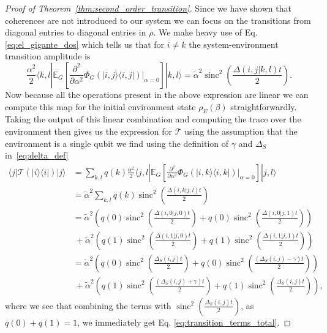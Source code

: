 \documentclass[
 amsmath,amssymb,
 aps,
onecolumn, 
nofootinbib]{revtex4-2}
\newcommand{\ket}[1]{|#1\rangle}
\newcommand{\bra}[1]{\langle #1|}
\newcommand{\ketbra}[2]{| #1\rangle\! \langle #2|}
\DeclareMathOperator{\sinc}{sinc}
\begin{document}
\begin{proof}[Proof of Theorem~\ref{thm:second_order_transition}]
    Since we have shown that coherences are not introduced to our system we can focus on the transitions from diagonal entries to diagonal entries in $\rho$. We make heavy use of Eq. \eqref{eq:el_gigante_dos} which tells us that for $i \neq k$ the system-environment transition amplitude is
    \begin{equation}
        \frac{\alpha^2}{2}\bra{k, l} \mathbb{E}_G \left[ \frac{\partial^2}{\partial \alpha^2} \Phi_G(\ketbra{i, j}{i,j}) \big|_{\alpha = 0} \right] \ket{k, l} = \widetilde{\alpha}^2 \sinc^2 \left( \frac{\Delta(i,j | k, l) t}{2} \right). 
    \end{equation}
    Now because all the operations present in the above expression are linear we can compute this map for the initial environment state $\rho_E(\beta)$ straightforwardly. Taking the output of this linear combination and computing the trace over the environment then gives us the expression for $\mathcal{T}$ using the assumption that the environment is a single qubit we find using the definition of $\gamma$ and $\Delta_S$ in~\eqref{eq:delta_def}
    \begin{align}
        \bra{j} \mathcal{T}(\ketbra{i}{i}) \ket{j} &= \sum_{k, l} q(k) \frac{\alpha^2}{2}\bra{j, l} \mathbb{E}_G \left[ \frac{\partial^2}{\partial \alpha^2} \Phi_G(\ketbra{i, k}{i,k}) \big|_{\alpha = 0} \right] \ket{j, l} \\
        &= \widetilde{\alpha}^2 \sum_{k, l} q(k) \sinc^2 \left(\frac{\Delta(i, k | j , l) t}{2} \right) \\
        &= \widetilde{\alpha}^2 \left(q(0) \sinc^2 \left(\frac{\Delta(i, 0 | j , 0) t}{2} \right) + q(0) \sinc^2 \left(\frac{\Delta(i, 0 | j , 1) t}{2} \right) \right) \nonumber \\
        & ~+ \widetilde{\alpha}^2 \left(q(1) \sinc^2 \left(\frac{\Delta(i, 1 | j , 0) t}{2} \right) + q(1) \sinc^2 \left(\frac{\Delta(i, 1 | j , 1) t}{2} \right) \right) \\
        &= \widetilde{\alpha}^2 \left(q(0) \sinc^2 \left(\frac{\Delta_S(i,j) t}{2} \right) + q(0) \sinc^2 \left(\frac{(\Delta_S(i,j) - \gamma) t}{2} \right) \right) \nonumber \\
        & ~+ \widetilde{\alpha}^2 \left(q(1) \sinc^2 \left(\frac{(\Delta_S(i, j) + \gamma) t}{2} \right) + q(1) \sinc^2 \left(\frac{\Delta_S(i,j) t}{2} \right) \right),
    \end{align}
    where we see that combining the terms with $\sinc^2 \left(\frac{\Delta_S(i,j) t}{2} \right)$, as $q(0) + q(1) = 1$, we immediately get Eq. \eqref{eq:transition_terms_total}. 


\end{proof}
\end{document}
